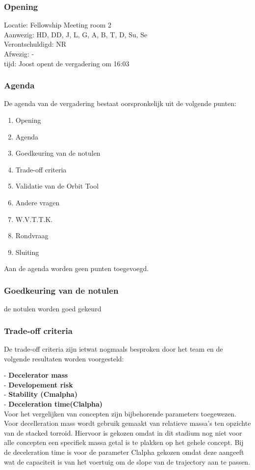 \subsubsection{Opening}
Locatie: Fellowship Meeting room 2\\
Aanwezig: HD, DD, J, L, G, A, B, T, D, Su, Se\\
Verontschuldigd: NR \\
Afwezig: - \\
tijd: Joost opent de vergadering om 16:03\\

\subsubsection{Agenda}
De agenda van de vergadering bestaat oorspronkelijk uit de volgende punten:
\begin{enumerate}
\item Opening
\item Agenda
\item Goedkeuring van de notulen
\item Trade-off criteria
\item Validatie van de Orbit Tool
\item Andere vragen
\item W.V.T.T.K.
\item Rondvraag
\item Sluiting
\end{enumerate}

Aan de agenda worden geen punten toegevoegd.

\subsubsection{Goedkeuring van de notulen}
de notulen worden goed gekeurd

\subsubsection{Trade-off criteria}
De trade-off criteria zijn ietwat nogmaals besproken door het team en de volgende resultaten worden voorgesteld:

- \textbf{Decelerator mass}\\
- \textbf{Developement risk}\\
- \textbf{Stability (Cmalpha)}\\
- \textbf{Deceleration time(Clalpha)}\\

Voor het vergelijken van concepten zijn bijbehorende parameters toegewezen. Voor decelleration mass wordt gebruik gemaakt van relatieve massa's ten opzichte van de stacked torroid. Hiervoor is gekozen omdat in dit stadium nog niet voor alle concepten een specifiek massa getal is te plakken op het gehele concept.  Bij de deceleration time is voor de parameter  Clalpha gekozen omdat deze aangeeft wat de capaciteit is van het voertuig om de slope van de trajectory aan te passen. \\

